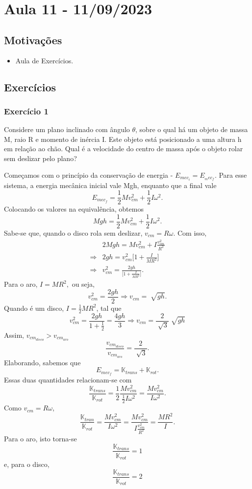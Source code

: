\documentclass[PhysicsII/physicsII_notes.tex]{subfiles}
\begin{document}
\section{Aula 11 - 11/09/2023}
\subsection{Motivações}
\begin{itemize}
	\item Aula de Exercícios.
\end{itemize}
\subsection{Exercícios}
\subsubsection{Exercício 1}
Considere um plano inclinado com ângulo \(\theta \), sobre o qual há um objeto de massa M, raio R e momento de inércia I.
Este objeto está posicionado a uma altura h em relação ao chão. Qual é a velocidade do centro de massa após o objeto rolar sem deslizar pelo plano?

Começamos com o princípio da conservação de energia - \(E_{mec_{i}} = E_{_mec_{f}}\). Para esse sistema, a energia mecânica inicial
vale Mgh, enquanto que a final vale
\[
	E_{mec_{f}} = \frac{1}{2}Mv_{cm}^{2} + \frac{1}{2}I\omega^{2}.
\]
Colocando os valores na equivalência, obtemos
\[
	Mgh = \frac{1}{2}Mv_{cm}^{2} + \frac{1}{2}I\omega^{2}.
\]
Sabe-se que, quando o disco rola sem deslizar, \(v_{cm} = R\omega \). Com isso,
\begin{align*}
	            & 2Mgh = Mv_{cm}^{2} + I \frac{v_{cm}^{2}}{R^{2}}              \\
	\Rightarrow & 2gh = v_{cm}^{2}\biggl[1 + \frac{I}{MR^{2}}\biggr]           \\
	\Rightarrow & v_{cm}^{2} = \frac{2gh}{\biggl[1 + \frac{I}{MR^{2}}\biggr]}.
\end{align*}
Para o aro, \(I = MR^{2},\) ou seja,
\[
	v_{cm}^{2} = \frac{2gh}{2} \Rightarrow v_{cm}=\sqrt[]{gh}.
\]
Quando é um disco, \(I=\frac{1}{2}MR^{2}\), tal que
\[
	v_{cm}^{2} = \frac{2gh}{1 + \frac{1}{2}} = \frac{4gh}{3} \Rightarrow v_{cm} = \frac{2}{\sqrt[]{3}}\sqrt[]{gh}
\]
Assim, \(v_{cm_{disco}} > v_{cm_{aro}}\)
\[
	\frac{v_{cm_{disco}}}{v_{cm_{aro}}} = \frac{2}{\sqrt[]{3}}.
\]
Elaborando, sabemos que
\[
	E_{mec_{f}} = \mathbb{K}_{trans} + \mathbb{K}_{rot}.
\]
Essas duas quantidades relacionam-se com
\[
	\frac{\mathbb{K}_{trans}}{\mathbb{K}_{rot}} = \frac{1}{2}\frac{Mv_{cm}^{2}}{\frac{1}{2}I\omega^{2}} = \frac{Mv_{cm}^{2}}{I\omega^{2}}.
\]
Como \(v_{cm}=R\omega \),
\[
	\frac{\mathbb{K}_{tran}}{\mathbb{K}_{rot}} = \frac{Mv_{cm}^{2}}{I\omega^{2}}=\frac{Mv_{cm}^{2}}{I \frac{v_{cm}^{2}}{R^{2}}} = \frac{MR^{2}}{I}.
\]
Para o aro, isto torna-se
\[
	\frac{\mathbb{K}_{trans}}{\mathbb{K}_{rot}} = 1
\]
e, para o disco,
\[
	\frac{\mathbb{K}_{trans}}{\mathbb{K}_{rot}} = 2
\]
\end{document}
